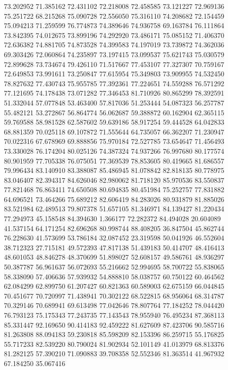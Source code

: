 73.202952
71.385162
72.431102
72.218008
72.458585
73.121227
72.969136
75.251722
68.215268
75.090728
72.556050
75.316110
74.208682
72.154459
75.094213
71.259599
76.774873
74.389646
74.936758
69.163784
76.111864
73.842395
74.012675
73.899196
74.292920
73.486171
75.085152
71.406370
72.636382
74.881705
74.873528
74.399583
74.197019
73.739872
74.362036
69.303426
72.060864
74.235897
73.197415
73.099537
75.621743
75.030579
72.899628
73.734674
79.426110
71.517667
77.453107
77.327307
70.759167
72.649853
73.991611
73.250847
77.615954
75.349803
73.909955
74.532450
78.827632
77.430743
75.955785
77.392361
77.224651
74.559288
76.571292
77.121695
74.178438
73.071282
77.346453
81.710926
80.865299
78.392591
51.332044
57.077848
53.463400
57.817036
51.253444
54.087323
56.257787
55.482121
53.272867
56.864774
56.062687
59.388872
60.162904
62.365115
59.769588
58.981528
62.587602
59.639186
58.917254
59.444528
64.042833
68.881359
70.025118
69.107872
71.555644
64.735057
66.362207
71.230947
70.022316
67.678969
69.888856
75.970184
72.527785
73.654647
71.456493
73.330028
76.174204
80.025126
74.387324
74.937266
76.997680
80.177574
80.901959
77.705338
76.075051
77.369539
78.853605
80.419665
81.686557
79.996434
83.140910
83.388087
85.486945
81.078842
82.818135
80.778975
83.046407
82.394317
84.626046
82.980062
81.718120
85.970536
83.550837
77.821468
76.863411
74.650508
80.694835
80.451984
75.252757
77.831882
64.696521
73.464266
75.689212
82.606419
84.283026
80.931879
81.885026
83.521984
62.489513
79.807378
51.657105
81.346971
84.139427
81.220434
77.294973
45.158548
84.394630
1.366177
72.282372
84.494028
20.604089
41.537154
64.171254
82.696268
80.998744
88.408205
36.847504
45.862744
76.228630
41.573699
53.786184
32.087452
23.319598
50.041926
46.552604
38.712323
27.715181
49.572393
47.817138
51.439183
50.414707
48.416413
48.601053
48.846278
48.370699
51.898027
52.608157
49.586761
48.936297
50.387787
56.961637
56.072693
55.216662
52.994695
58.700722
55.838065
58.338090
57.406636
57.939932
54.888810
58.038757
60.750122
60.464562
62.084299
62.899750
61.207427
60.821363
60.589003
62.675159
66.044845
70.451677
70.720997
71.438941
70.302122
68.522815
68.956064
68.314787
70.329146
70.689941
69.613498
77.042646
78.807764
77.184252
78.044420
76.793123
75.175343
77.243735
77.143543
78.955940
76.495234
87.368113
85.331447
92.169650
90.414183
92.459222
81.627609
87.423706
90.585716
81.263808
88.094183
59.230818
85.598209
82.153396
86.259715
55.176825
55.717233
82.539220
80.790024
81.902934
52.101149
41.013979
68.813376
81.282125
57.390210
71.090883
39.708358
52.552346
81.363514
41.967932
67.184250
35.067416
